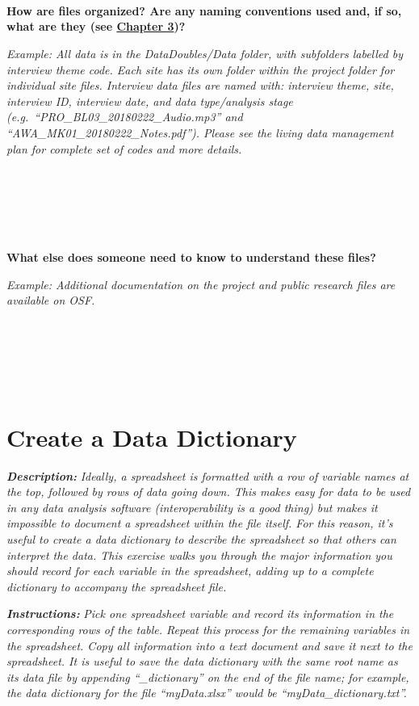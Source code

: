 \documentclass[
]{book}
\begin{document}
~

~

~

\textbf{How are files organized? Are any naming conventions used and, if so, what are they (see \protect\hyperlink{file-organization-and-naming}{Chapter 3})?}

\emph{Example: All data is in the DataDoubles/Data folder, with subfolders labelled by interview theme code. Each site has its own folder within the project folder for individual site files. Interview data files are named with: interview theme, site, interview ID, interview date, and data type/analysis stage (e.g.~``PRO\_BL03\_20180222\_Audio.mp3'' and ``AWA\_MK01\_20180222\_Notes.pdf''). Please see the living data management plan for complete set of codes and more details.}

~

~

~

\textbf{What else does someone need to know to understand these files?}

\emph{Example: Additional documentation on the project and public research files are available on OSF.}

~

~

~

\hypertarget{data-dictionary}{%
\section{Create a Data Dictionary}\label{data-dictionary}}

\textbf{\emph{Description:}} \emph{Ideally, a spreadsheet is formatted with a row of variable names at the top, followed by rows of data going down. This makes easy for data to be used in any data analysis software (interoperability is a good thing) but makes it impossible to document a spreadsheet within the file itself. For this reason, it's useful to create a data dictionary to describe the spreadsheet so that others can interpret the data. This exercise walks you through the major information you should record for each variable in the spreadsheet, adding up to a complete dictionary to accompany the spreadsheet file.}

\textbf{\emph{Instructions:}} \emph{Pick one spreadsheet variable and record its information in the corresponding rows of the table. Repeat this process for the remaining variables in the spreadsheet. Copy all information into a text document and save it next to the spreadsheet. It is useful to save the data dictionary with the same root name as its data file by appending ``\_dictionary'' on the end of the file name; for example, the data dictionary for the file ``myData.xlsx'' would be ``myData\_dictionary.txt''.}
\end{document}
